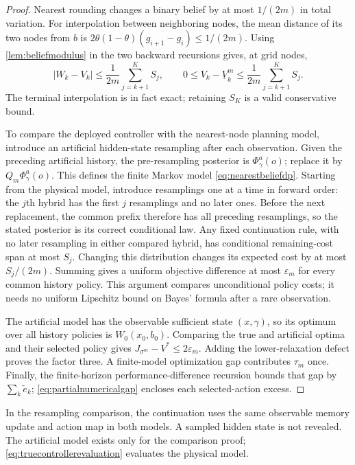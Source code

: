\begin{proof}
Nearest rounding changes a binary belief by at most $1/(2m)$ in total
variation. For interpolation between neighboring nodes, the mean distance
of its two nodes from $b$ is
$2\theta(1-\theta)(g_{i+1}-g_i)\le1/(2m)$.
Using \cref{lem:beliefmodulus} in the two backward recursions gives,
at grid nodes,
\[
 |W_k-V_k|\le\frac1{2m}\sum_{j=k+1}^K S_j,\qquad
 0\le V_k-\underline V_k^m\le\frac1{2m}\sum_{j=k+1}^K S_j.
\]
The terminal interpolation is in fact exact; retaining $S_K$ is a valid
conservative bound.

To compare the deployed controller with the nearest-node planning model,
introduce an artificial hidden-state resampling after each observation.
Given the preceding artificial history, the pre-resampling posterior is
$\Phi_\gamma^a(o)$; replace it by $Q_m\Phi_\gamma^a(o)$. This defines the
finite Markov model \eqref{eq:nearestbeliefdp}. Starting from the physical
model, introduce resamplings one at a time in forward order: the $j$th
hybrid has the first $j$ resamplings and no later ones. Before the next
replacement, the common prefix therefore has all preceding resamplings,
so the stated posterior is its correct conditional law. Any fixed
continuation rule, with no later resampling in either compared hybrid, has conditional
remaining-cost span at most $S_j$. Changing this distribution changes its
expected cost by at most $S_j/(2m)$. Summing gives a uniform objective
difference at most $\varepsilon_m$ for every common history policy.
This argument compares unconditional policy costs; it needs no uniform
Lipschitz bound on Bayes' formula after a rare observation.

The artificial model has the observable sufficient state $(x,\gamma)$,
so its optimum over all history policies is $W_0(x_0,b_0)$. Comparing the
true and artificial optima and their selected policy gives
$J_{\sigma^m}-V^*\le2\varepsilon_m$. Adding the lower-relaxation defect
proves the factor three. A finite-model optimization gap contributes
$\tau_m$ once. Finally, the finite-horizon performance-difference recursion
bounds that gap by $\sum_k\tilde e_k$; \eqref{eq:partialnumericalgap} encloses each
selected-action excess.
\end{proof}

In the resampling comparison, the continuation uses the same observable
memory update and action map in both models. A sampled hidden state is not
revealed. The artificial model exists only for the comparison proof;
\eqref{eq:truecontrollerevaluation} evaluates the physical model.

